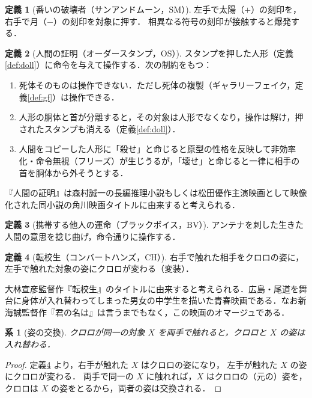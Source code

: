 \documentclass[a4paper,12pt]{jarticle}
\theoremstyle{definition}
\newtheorem{definition}{定義}
\theoremstyle{plain}
\newtheorem{cor}{系}
\theoremstyle{definition}
\theoremstyle{remark}
\newcommand{\OS}{\mathrm{OS}}    %
\newcommand{\BV}{\mathrm{BV}}    %
\newcommand{\CH}{\mathrm{CH}}    %
\newcommand{\SM}{\mathrm{SM}}    %
\begin{document}
\begin{definition}[番いの破壊者（サンアンドムーン，$\SM$）]\label{def:sm}
左手で太陽（$+$）の刻印を，右手で月（$-$）の刻印を対象に押す．
相異なる符号の刻印が接触すると爆発する．
\end{definition}



\begin{definition}[人間の証明（オーダースタンプ，$\OS$）]\label{def:os}
スタンプを押した人形（定義\ref{def:doll}）に命令を与えて操作する．次の制約をもつ：
\begin{enumerate}
\item[(i)] 死体そのものは操作できない．ただし死体の複製（ギャラリーフェイク，定義\ref{def:gf}）は操作できる．
\item[(ii)] 人形の胴体と首が分離すると，その対象は人形でなくなり，操作は解け，押されたスタンプも消える（定義\ref{def:doll}）．
\item[(iii)] 人間をコピーした人形に「殺せ」と命じると原型の性格を反映して非効率化・命令無視（フリーズ）が生じうるが，「壊せ」と命じると一律に相手の首を胴体から外そうとする．
\end{enumerate}
\end{definition}

『人間の証明』は森村誠一の長編推理小説もしくは松田優作主演映画として映像化された同小説の角川映画タイトルに由来すると考えられる．


\begin{definition}[携帯する他人の運命（ブラックボイス，$\BV$）]\label{def:bv}
アンテナを刺した生きた人間の意思を捻じ曲げ，命令通りに操作する．
\end{definition}

\begin{definition}[転校生（コンバートハンズ，$\CH$）]\label{def:ch}
右手で触れた相手をクロロの姿に，左手で触れた対象の姿にクロロが変わる（変装）．
\end{definition}

大林宣彦監督作『転校生』のタイトルに由来すると考えられる．広島・尾道を舞台に身体が入れ替わってしまった男女の中学生を描いた青春映画である．なお新海誠監督作『君の名は』は言うまでもなく，この映画のオマージュである．

\begin{cor}[姿の交換]\label{cor:swap}
クロロが同一の対象 $X$ を両手で触れると，クロロと $X$ の姿は入れ替わる．
\end{cor}

\begin{proof}
定義\ref{def:ch} より，右手が触れた $X$ はクロロの姿になり，
左手が触れた $X$ の姿にクロロが変わる．
両手で同一の $X$ に触れれば，$X$ はクロロの（元の）姿を，
クロロは $X$ の姿をとるから，両者の姿は交換される．
\end{proof}
\end{document}
